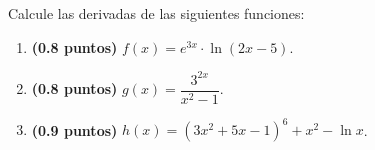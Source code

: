 
Calcule las derivadas de las siguientes funciones:
\begin{enumerate}[label=\alph*)]
\item \textbf{(0.8 puntos)} $f(x)=e^{3x}\cdot\ln(2x-5)$.
\item \textbf{(0.8 puntos)} $g(x)=\dfrac{3^{2x}}{x^2-1}$.
\item \textbf{(0.9 puntos)} $h(x)=(3x^2+5x-1)^6+x^2-\ln x$.\textunderscore{}
\end{enumerate}

